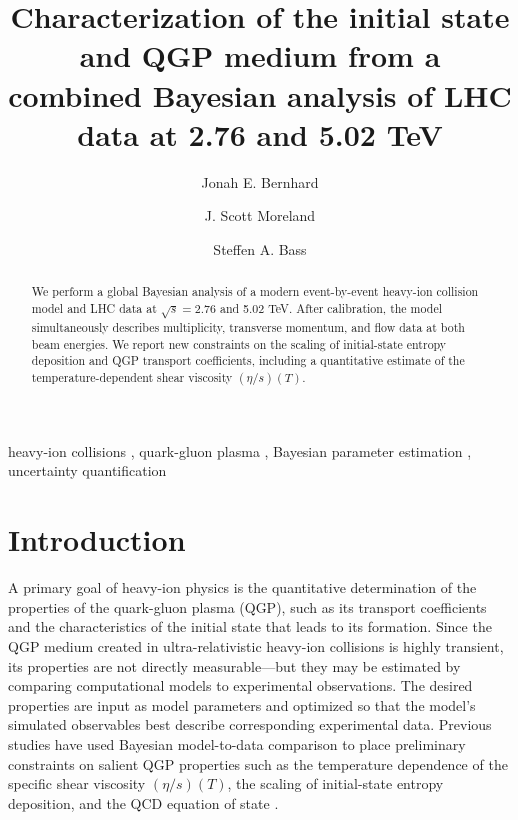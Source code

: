 \documentclass[3p,times,procedia,sort&compress]{elsarticle}
\begin{document}
\begin{frontmatter}

\dochead{}

\title{Characterization of the initial state and QGP medium from a combined Bayesian analysis of LHC data at 2.76 and 5.02 TeV}

\author{Jonah E. Bernhard}
\author{J. Scott Moreland}
\author{Steffen A. Bass}

\address{Department of Physics, Duke University, Durham, NC 27708}

\begin{abstract}
  We perform a global Bayesian analysis of a modern event-by-event heavy-ion collision model and LHC data at $\sqrt s = 2.76$ and 5.02 TeV.
  After calibration, the model simultaneously describes multiplicity, transverse momentum, and flow data at both beam energies.
  We report new constraints on the scaling of initial-state entropy deposition and QGP transport coefficients, including a quantitative estimate of the temperature-dependent shear viscosity $(\eta/s)(T)$.
\end{abstract}

\begin{keyword}
  heavy-ion collisions \sep
  quark-gluon plasma \sep
  Bayesian parameter estimation \sep
  uncertainty quantification
\end{keyword}

\end{frontmatter}

\section{Introduction}

A primary goal of heavy-ion physics is the quantitative determination of the properties of the quark-gluon plasma (QGP), such as its transport coefficients and the characteristics of the initial state that leads to its formation.
Since the QGP medium created in ultra-relativistic heavy-ion collisions is highly transient, its properties are not directly measurable---but they may be estimated by comparing computational models to experimental observations.
The desired properties are input as model parameters and optimized so that the model's simulated observables best describe corresponding experimental data.
Previous studies have used Bayesian model-to-data comparison to place preliminary constraints on salient QGP properties such as the temperature dependence of the specific shear viscosity $(\eta/s)(T)$, the scaling of initial-state entropy deposition, and the QCD equation of state \cite{Bernhard:2015hxa, Bernhard:2016tnd, Novak:2013bqa, Pratt:2015zsa}.
\end{document}

